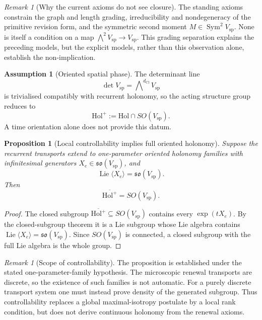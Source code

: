 \documentclass[11pt]{article}
\newtheorem{proposition}[theorem]{Proposition}
\theoremstyle{definition}
\newtheorem{assumption}{Assumption}[section]
\theoremstyle{remark}
\newtheorem{remark}[theorem]{Remark}
\newcommand{\dCl}{d_{\mathrm{Cl}}}
\newcommand{\Vsp}{V_{\mathrm{sp}}}
\newcommand{\Hol}{\mathrm{Hol}}
\newcommand{\Holp}{\mathrm{Hol}^{+}}
\newcommand{\Lie}{\operatorname{Lie}}
\begin{document}
\begin{remark}[Why the current axioms do not see closure]
The standing axioms constrain the graph and length grading, irreducibility and
nondegeneracy of the primitive revision form, and the symmetric second moment
\(M\in\operatorname{Sym}^2\Vsp\). None is itself a condition on a map
\(\bigwedge^2\Vsp\to\Vsp\). This grading separation explains the preceding
models, but the explicit models, rather than this observation alone, establish
the non-implication.
\end{remark}

\begin{assumption}[Oriented spatial phase]
\label{hyp:oriented-spatial-phase}
The determinant line
\[
  \det\Vsp=\bigwedge\nolimits^{\dCl}\Vsp
\]
is trivialised compatibly with recurrent holonomy, so the acting structure group
reduces to
\[
  \Holp:=\Hol\cap SO(\Vsp).
\]
A time orientation alone does not provide this datum.
\end{assumption}

\begin{proposition}[Local controllability implies full oriented holonomy]
\label{prop:interference-controllability}
Suppose the recurrent transports extend to one-parameter oriented holonomy
families with infinitesimal generators \(X_e\in\mathfrak{so}(\Vsp)\), and
\[
  \Lie\langle X_e\rangle=\mathfrak{so}(\Vsp).
\]
Then
\[
  \overline{\Holp}=SO(\Vsp).
\]
\end{proposition}

\begin{proof}
The closed subgroup \(\overline{\Holp}\subseteq SO(\Vsp)\) contains every
\(\exp(tX_e)\). By the closed-subgroup theorem it is a Lie subgroup whose Lie
algebra contains \(\Lie\langle X_e\rangle=\mathfrak{so}(\Vsp)\). Since
\(SO(\Vsp)\) is connected, a closed subgroup with the full Lie algebra is the
whole group.
\end{proof}

\begin{remark}[Scope of controllability]
The proposition is established under the stated one-parameter-family
hypothesis. The microscopic renewal transports are discrete, so the existence
of such families is not automatic. For a purely discrete transport system one
must instead prove density of the generated subgroup. Thus controllability
replaces a global maximal-isotropy postulate by a local rank condition, but does
not derive continuous holonomy from the renewal axioms.
\end{remark}
\end{document}
